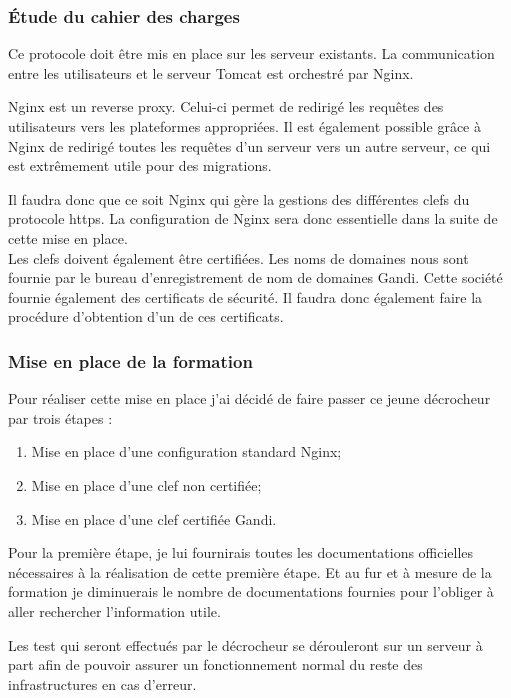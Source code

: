 \subsubsection{Étude du cahier des charges}

Ce protocole doit être mis en place sur les serveur existants. La communication entre les utilisateurs et le serveur Tomcat est orchestré par Nginx.

Nginx est un reverse proxy. Celui-ci permet de redirigé les requêtes des utilisateurs vers les plateformes appropriées. Il est également possible grâce à Nginx de redirigé toutes les requêtes d'un serveur vers un autre serveur, ce qui est extrêmement utile pour des migrations.

Il faudra donc que ce soit Nginx qui gère la gestions des différentes clefs du protocole https. La configuration de Nginx sera donc essentielle dans la suite de cette mise en place.\\

Les clefs doivent également être certifiées. Les noms de domaines nous sont fournie par le bureau d'enregistrement de nom de domaines Gandi. Cette société fournie également des certificats de sécurité. Il faudra donc également faire la procédure d'obtention d'un de ces certificats.

\subsubsection{Mise en place de la formation}

Pour réaliser cette mise en place j'ai décidé de faire passer ce jeune décrocheur par trois étapes :

\begin{enumerate}
	\item Mise en place d'une configuration standard Nginx;
	\item Mise en place d'une clef non certifiée;
	\item Mise en place d'une clef certifiée Gandi.
\end{enumerate}

Pour la première étape, je lui fournirais toutes les documentations officielles nécessaires à la réalisation de cette première étape. Et au fur et à mesure de la formation je diminuerais le nombre de documentations fournies pour l'obliger à aller rechercher l'information utile.

Les test qui seront effectués par le décrocheur se dérouleront sur un serveur à part afin de pouvoir assurer un fonctionnement normal du reste des infrastructures en cas d'erreur.\\\\

